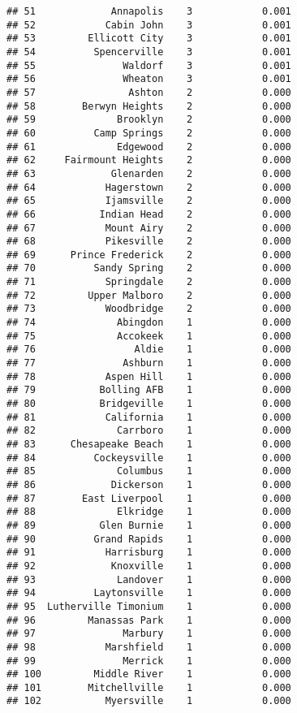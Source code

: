 \documentclass[]{article}
\begin{document}
\begin{verbatim}
## 51             Annapolis    3            0.001
## 52            Cabin John    3            0.001
## 53         Ellicott City    3            0.001
## 54          Spencerville    3            0.001
## 55               Waldorf    3            0.001
## 56               Wheaton    3            0.001
## 57                Ashton    2            0.000
## 58        Berwyn Heights    2            0.000
## 59              Brooklyn    2            0.000
## 60          Camp Springs    2            0.000
## 61              Edgewood    2            0.000
## 62     Fairmount Heights    2            0.000
## 63             Glenarden    2            0.000
## 64            Hagerstown    2            0.000
## 65            Ijamsville    2            0.000
## 66           Indian Head    2            0.000
## 67            Mount Airy    2            0.000
## 68            Pikesville    2            0.000
## 69      Prince Frederick    2            0.000
## 70          Sandy Spring    2            0.000
## 71            Springdale    2            0.000
## 72         Upper Malboro    2            0.000
## 73            Woodbridge    2            0.000
## 74              Abingdon    1            0.000
## 75              Accokeek    1            0.000
## 76                 Aldie    1            0.000
## 77               Ashburn    1            0.000
## 78            Aspen Hill    1            0.000
## 79           Bolling AFB    1            0.000
## 80           Bridgeville    1            0.000
## 81            California    1            0.000
## 82              Carrboro    1            0.000
## 83      Chesapeake Beach    1            0.000
## 84          Cockeysville    1            0.000
## 85              Columbus    1            0.000
## 86             Dickerson    1            0.000
## 87        East Liverpool    1            0.000
## 88              Elkridge    1            0.000
## 89           Glen Burnie    1            0.000
## 90          Grand Rapids    1            0.000
## 91            Harrisburg    1            0.000
## 92             Knoxville    1            0.000
## 93              Landover    1            0.000
## 94          Laytonsville    1            0.000
## 95  Lutherville Timonium    1            0.000
## 96         Manassas Park    1            0.000
## 97               Marbury    1            0.000
## 98            Marshfield    1            0.000
## 99               Merrick    1            0.000
## 100         Middle River    1            0.000
## 101        Mitchellville    1            0.000
## 102           Myersville    1            0.000

\end{verbatim}
\end{document}
